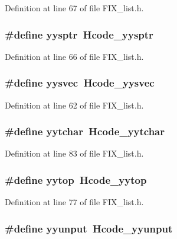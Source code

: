 Definition at line 67 of file FIX\_\-list.h.
\subsubsection{\setlength{\rightskip}{0pt plus 5cm}\#define \bf{yysptr}~Hcode\_\-yysptr}\label{FIX__list_8h_8984e26ee0525a00f797b720085bdb92}




Definition at line 66 of file FIX\_\-list.h.
\subsubsection{\setlength{\rightskip}{0pt plus 5cm}\#define \bf{yysvec}~Hcode\_\-yysvec}\label{FIX__list_8h_e800e78dfdbb5677f1bb9c3c957cf1fe}




Definition at line 62 of file FIX\_\-list.h.
\subsubsection{\setlength{\rightskip}{0pt plus 5cm}\#define \bf{yytchar}~Hcode\_\-yytchar}\label{FIX__list_8h_10c4fa1591f77b5cbf357d3acaf41220}




Definition at line 83 of file FIX\_\-list.h.
\subsubsection{\setlength{\rightskip}{0pt plus 5cm}\#define \bf{yytop}~Hcode\_\-yytop}\label{FIX__list_8h_21b4e3db030985a6942163d993b4088e}




Definition at line 77 of file FIX\_\-list.h.
\subsubsection{\setlength{\rightskip}{0pt plus 5cm}\#define yyunput~Hcode\_\-yyunput}\label{FIX__list_8h_5932d5d9168145d7af38eb53eb894347}




